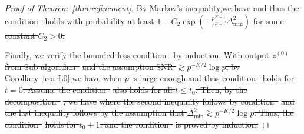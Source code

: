 \documentclass[lettersize,onecolumn,journal]{IEEEtran}
\theoremstyle{definition}
\theoremstyle{definition}
\newcommand{\of}[1]{\left(#1\right)}
\providecommand{\DIFdeltex}[1]{{\protect\color{red}\sout{#1}}}                      %
\providecommand{\DIFdel}[1]{\texorpdfstring{\DIFdeltex{#1}}{}} %
\begin{document}
\begin{proof}[Proof of Theorem~\ref{thm:refinement}]
\DIFdel{By Markov's inequality,we have 
    }%
\DIFdel{and thus the condition~}%
\DIFdel{holds with probability at least $1 -  C_2 \exp \of{  - \frac{p^{K-1}}{r^{K-1}}   \Delta_{\min}^2 }$ for some constant $C_2 > 0$.
    }%

\DIFdel{Finally, we verify the bounded loss condition~}%
\DIFdel{by induction.  With output $z^{(0)}$ from Sub-algorithm~}%
\DIFdel{and the assumption SNR $\gtrsim p^{-K/2} \log p$, by Corollary~\ref{cor:L0},we have 
    }%
\DIFdel{when $p$ is large enough,and thus condition~}%
\DIFdel{holds for $t = 0$. Assume the condition~}%
\DIFdel{also holds for all $t \leq t_0$. Then, by the decomposition~}%
\DIFdel{, we have 
    }%
\DIFdel{where the second inequality follows by condition~}%
\DIFdel{and the last inequality follows by the assumption that $\Delta_{\min}^2 \gtrsim p^{-K/2} \log p$. Thus, the condition~}%
\DIFdel{holds for $t_0 + 1$, and the condition~}%
\DIFdel{is proved by induction.
}%


\end{proof}
\end{document}

